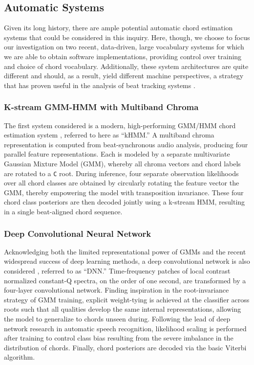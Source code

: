 \documentclass{article}
\begin{document}
\subsection{Automatic Systems}
\label{subsec:systems}

Given its long history, there are ample potential automatic chord estimation systems that could be considered in this inquiry.
Here, though, we choose to focus our investigation on two recent, data-driven, large vocabulary systems for which we are able to obtain software implementations, providing control over training and choice of chord vocabulary.
Additionally, these system architectures are quite different and should, as a result, yield different machine perspectives, a strategy that has proven useful in the analysis of beat tracking systems \cite{Zapata2012Assigning}.


\subsubsection{K-stream GMM-HMM with Multiband Chroma}
\label{subsubsec:kHMM}

The first system considered is a modern, high-performing GMM/HMM chord estimation system \cite{Cho2014Improved}, referred to here as ``kHMM.''
A multiband chroma representation is computed from beat-synchronous audio analysis, producing four parallel feature representations.
Each is modeled by a separate multivariate Gaussian Mixture Model (GMM), whereby all chroma vectors and chord labels are rotated to a \texttt{C} root.
During inference, four separate observation likelihoods over all chord classes are obtained by circularly rotating the feature vector the GMM, thereby empowering the model with transposition invariance.
These four chord class posteriors are then decoded jointly using a k-stream HMM, resulting in a single beat-aligned chord sequence.


\subsubsection{Deep Convolutional Neural Network}
\label{subsubsec:DNN}

Acknowledging both the limited representational power of GMMs and the recent widespread success of deep learning methods, a deep convolutional network is also considered \cite{Humphrey2015Fully}, referred to as ``DNN.''
Time-frequency patches of local contrast normalized constant-Q spectra, on the order of one second, are transformed by a four-layer convolutional network.
Finding inspiration in the root-invariance strategy of GMM training, explicit weight-tying is achieved at the classifier across roots such that all qualities develop the same internal representations, allowing the model to generalize to chords unseen during.
Following the lead of deep network research in automatic speech recognition, likelihood scaling is performed after training to control class bias resulting from the severe imbalance in the distribution of chords.
Finally, chord posteriors are decoded via the basic Viterbi algorithm.
\end{document}
